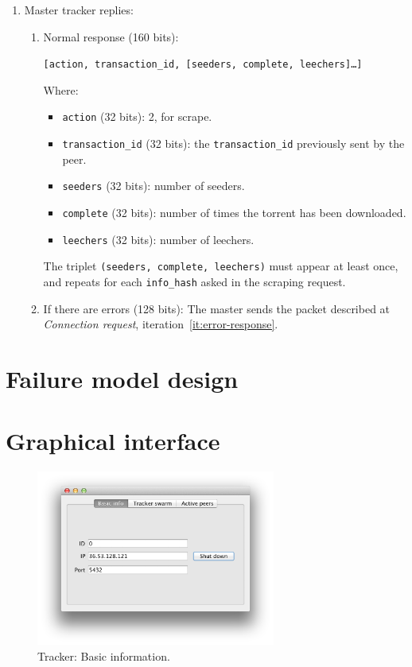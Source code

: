 \documentclass[twoside,a4paper,10pt]{article}
\begin{document}
\begin{itemize}
\begin{itemize}
\begin{enumerate}
    \item Master tracker replies:

      \begin{enumerate}
      \item Normal response (160 bits):

        \texttt{[action, transaction\_id, [seeders, complete, leechers]\ldots]}

        Where:
        \begin{itemize}
        \item \texttt{action} (32 bits): 2, for scrape.
        \item \texttt{transaction\_id} (32 bits): the \texttt{transaction\_id}
          previously sent by the peer.
        \item \texttt{seeders} (32 bits): number of seeders.
        \item \texttt{complete} (32 bits): number of times the torrent has
          been downloaded.
        \item \texttt{leechers} (32 bits): number of leechers.
        \end{itemize}

        The triplet \texttt{(seeders, complete, leechers)} must appear at least
        once, and repeats for each \texttt{info\_hash} asked in the scraping
        request.
        
      \item If there are errors (128 bits): The master sends the packet
        described at \emph{Connection request},
        iteration~\ref{it:error-response}.
      \end{enumerate}
    \end{enumerate}
  \end{itemize}
\end{itemize}

\section{Failure model design}

\section{Graphical interface}

\begin{figure}[!htp]
  \centering
  \includegraphics[width=0.7\textwidth]{imgs/tracker/basicInfo.png}
  \caption{\label{fig:basicInfo}Tracker: Basic information.}
\end{figure}



\end{document}
